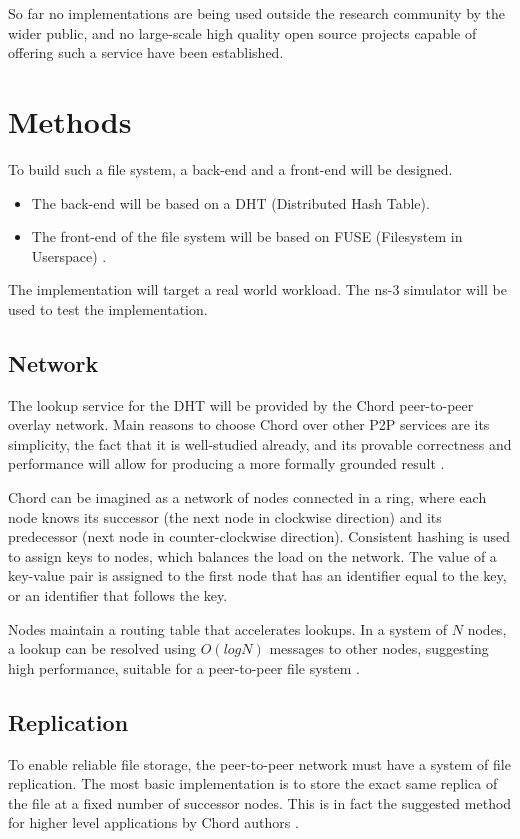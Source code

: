 \documentclass[8pt,a4paper]{article}
\begin{document}
So far no implementations are being used outside the research community by the wider public, and no large-scale high quality open source projects capable of offering such a service have been established.

\section{Methods}

To build such a file system, a back-end and a front-end will be designed.

\begin{itemize}
\item The back-end will be based on a DHT (Distributed Hash Table). 
\item The front-end of the file system will be based on FUSE (Filesystem in Userspace) \cite{fuse}.
\end{itemize}
The implementation will target a real world workload. The ns-3 \cite{ns3} simulator will be used to test the implementation.

\subsection{Network}
The lookup service for the DHT will be provided by the Chord peer-to-peer overlay network. Main reasons to choose Chord over other P2P services are its simplicity, the fact that it is well-studied already, and its provable correctness and performance will allow for producing a more formally grounded result \cite{chord}. %

Chord can be imagined as a network of nodes connected in a ring, where each node knows its successor (the next node in clockwise direction) and its predecessor (next node in counter-clockwise direction). Consistent hashing is used to assign keys to nodes, which balances the load on the network. The value of a key-value pair is assigned to the first node that has an identifier equal to the key, or an identifier that follows the key. 

Nodes maintain a routing table that accelerates lookups. In a system of $N$ nodes, a lookup can be resolved using $O(log N)$ messages to other nodes, suggesting high performance, suitable for a peer-to-peer file system \cite{chord}.

\subsection{Replication}
To enable reliable file storage, the peer-to-peer network must have a system of file replication. The most basic implementation is to store the exact same replica of the file at a fixed number of successor nodes. This is in fact the suggested method for higher level applications by Chord authors \cite{chord}.
\end{document}
